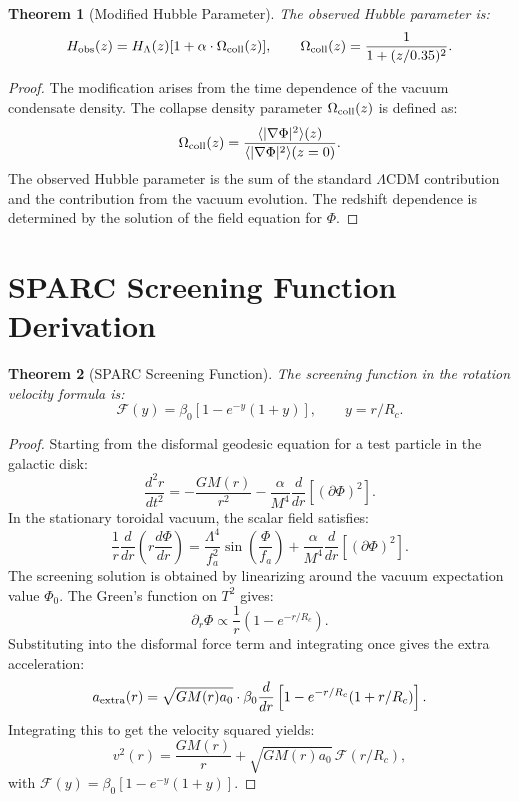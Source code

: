 \documentclass[12pt,oneside]{book}
\newtheorem{theorem}{Theorem}[chapter]
\begin{document}
\begin{theorem}[Modified Hubble Parameter]
The observed Hubble parameter is:
\[
H_{\rm obs}(z) = H_\Lambda(z)[1 + \alpha \cdot \Omega_{\rm coll}(z)], \qquad \Omega_{\rm coll}(z) = \frac{1}{1 + (z/0.35)^2}.
\]
\end{theorem}

\begin{proof}
The modification arises from the time dependence of the vacuum condensate density. The collapse density parameter $\Omega_{\rm coll}(z)$ is defined as:
\[
\Omega_{\rm coll}(z) = \frac{\langle|\nabla\Phi|^2\rangle(z)}{\langle|\nabla\Phi|^2\rangle(z=0)}.
\]
The observed Hubble parameter is the sum of the standard $\Lambda$CDM contribution and the contribution from the vacuum evolution. The redshift dependence is determined by the solution of the field equation for $\Phi$.
\end{proof}

\section{SPARC Screening Function Derivation}

\begin{theorem}[SPARC Screening Function]
The screening function in the rotation velocity formula is:
\[
\mathcal{F}(y) = \beta_0 \left[1 - e^{-y}(1 + y)\right], \qquad y = r/R_c.
\]
\end{theorem}

\begin{proof}
Starting from the disformal geodesic equation for a test particle in the galactic disk:
\[
\frac{d^2r}{dt^2} = -\frac{GM(r)}{r^2} - \frac{\alpha}{M^4}\frac{d}{dr}\left[(\partial\Phi)^2\right].
\]
In the stationary toroidal vacuum, the scalar field satisfies:
\[
\frac{1}{r}\frac{d}{dr}\left(r\frac{d\Phi}{dr}\right) = \frac{\Lambda^4}{f_a^2}\sin\left(\frac{\Phi}{f_a}\right) + \frac{\alpha}{M^4}\frac{d}{dr}\left[(\partial\Phi)^2\right].
\]
The screening solution is obtained by linearizing around the vacuum expectation value $\Phi_0$. The Green's function on $T^2$ gives:
\[
\partial_r \Phi \propto \frac{1}{r}\left(1 - e^{-r/R_c}\right).
\]
Substituting into the disformal force term and integrating once gives the extra acceleration:
\[
a_{\rm extra}(r) = \sqrt{GM(r) a_0} \cdot \beta_0 \frac{d}{dr}\left[1 - e^{-r/R_c}(1 + r/R_c)\right].
\]
Integrating this to get the velocity squared yields:
\[
v^2(r) = \frac{GM(r)}{r} + \sqrt{GM(r) a_0}\,\mathcal{F}(r/R_c),
\]
with $\mathcal{F}(y) = \beta_0[1 - e^{-y}(1 + y)]$.
\end{proof}
\end{document}
